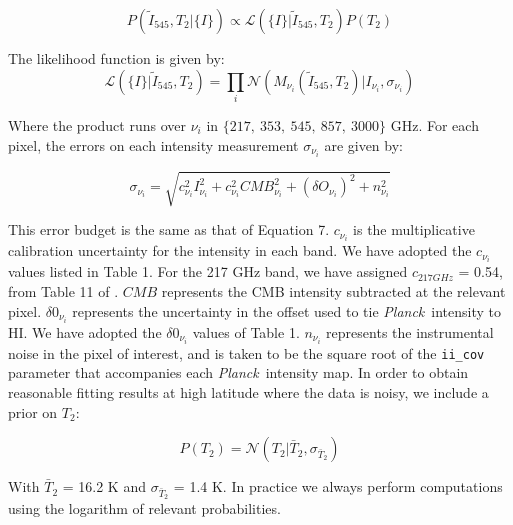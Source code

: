 \documentclass{emulateapj}
\newcommand{\PLANCK}{{\it Planck}}
\begin{document}
\begin{equation}
P(\tilde{I}_{545}, T_2|\{I\}) \propto \mathcal{L}(\{I\}|\tilde{I}_{545}, T_2)P(T_2)
\end{equation}

The likelihood function is given by:
\begin{equation}
\mathcal{L}(\{I\}|\tilde{I}_{545}, T_2) = \displaystyle\prod\limits_{i}\mathcal{N}(M_{\nu_{i}}(\tilde{I}_{545}, T_2)|I_{\nu_{i}}, \sigma_{\nu_i})
\end{equation}


Where the product runs over $\nu_i$ in $\{217,\ 353,\ 545,\ 857,\ 3000\}$ GHz. 
For each pixel, the errors on each intensity measurement $\sigma_{\nu_i}$ are 
given by:

\begin{equation}
\sigma_{\nu_i} = \sqrt{c^2_{\nu_i}I^2_{\nu_i} + c^2_{\nu_i}CMB^2_{\nu_i} + (\delta O_{\nu_i})^2 + n^2_{\nu_i}}
\end{equation}


This error budget is the same as that of \cite{planckdust} Equation 7. 
$c_{\nu_i}$ is the multiplicative calibration uncertainty for the intensity in 
each band. We have adopted the $c_{\nu_i}$ values listed in \cite{planckdust} 
Table 1. For the 217 GHz band, we have assigned $c_{217 GHz}$ = 0.54, from 
Table 11 of \cite{planckcalib}. $CMB$ represents the CMB intensity 
subtracted at the relevant pixel. $\delta0_{\nu_i}$ represents the uncertainty
in the offset used to tie \PLANCK~intensity to HI. We have adopted the 
 $\delta0_{\nu_i}$ values of \cite{planckdust} Table 1. $n_{\nu_i}$ represents 
the instrumental noise in the pixel of interest, and is taken to be the square 
root of the \verb|ii_cov| parameter that accompanies each \PLANCK~intensity 
map. In order to obtain reasonable fitting results at high latitude where the 
data is noisy, we include a prior on $T_2$:


\begin{equation}
P(T_2) = \mathcal{N}(T_2|\bar{T}_2, \sigma_{\bar{T}_2})
\end{equation}

With $\bar{T}_2$ = 16.2 K and $\sigma_{\bar{T}_2}$ = 1.4 K. In practice we 
always perform computations using the logarithm of relevant probabilities.
\end{document}
